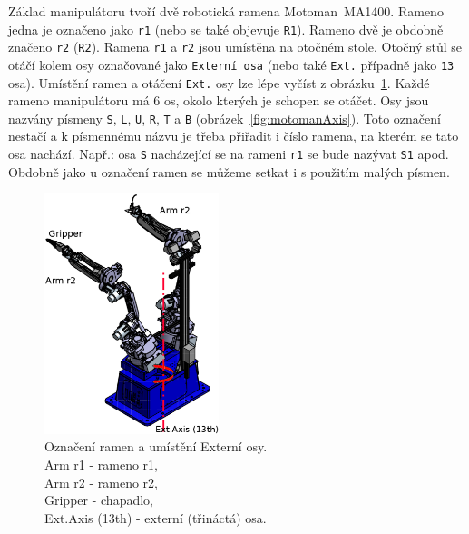 \documentclass[10pt,a4paper,titlepage,oneside]{report}
\begin{document}
Základ manipulátoru tvoří dvě robotická ramena Motoman~MA1400. Rameno jedna je označeno jako \verb|r1| (nebo se také objevuje \verb|R1|). Rameno dvě je obdobně značeno \verb|r2| (\verb|R2|). Ramena \verb|r1| a \verb|r2| jsou umístěna na otočném stole. Otočný stůl se otáčí kolem osy označované jako \verb|Externí osa| (nebo také \verb|Ext.| případně jako \verb|13| osa). Umístění ramen a otáčení \verb|Ext.| osy lze lépe vyčíst z obrázku~\ref{fig:motomanAndTable}. Každé rameno manipulátoru má 6 os, okolo kterých je schopen se otáčet. Osy jsou nazvány písmeny \verb|S|, \verb|L|, \verb|U|, \verb|R|, \verb|T| a \verb|B| (obrázek~\ref{fig:motomanAxis}). Toto označení nestačí a k písmennému názvu je třeba přiřadit i číslo ramena, na kterém se tato osa nachází. Např.: osa \verb|S| nacházející se na rameni \verb|r1| se bude nazývat \verb|S1| apod. Obdobně jako u označení ramen se můžeme setkat i s použitím malých písmen.
\begin{figure}[H]
	\centering  	
  	\includegraphics[height=7cm]{pictures/motomanCelek.eps}
  	\caption[]{Označení ramen a umístění Externí osy.\\
	Arm r1 - rameno r1,\\
	Arm r2 - rameno r2,\\
	Gripper - chapadlo,\\
	Ext.Axis (13th) - externí (třináctá) osa.	  	
  	}
  	\label{fig:motomanAndTable}
\end{figure}
\end{document}
